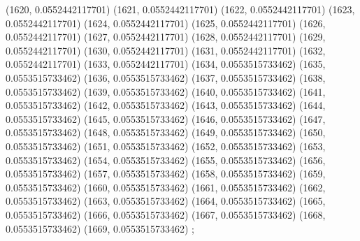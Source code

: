 {					(1620, 0.0552442117701)
					(1621, 0.0552442117701)
					(1622, 0.0552442117701)
					(1623, 0.0552442117701)
					(1624, 0.0552442117701)
					(1625, 0.0552442117701)
					(1626, 0.0552442117701)
					(1627, 0.0552442117701)
					(1628, 0.0552442117701)
					(1629, 0.0552442117701)
					(1630, 0.0552442117701)
					(1631, 0.0552442117701)
					(1632, 0.0552442117701)
					(1633, 0.0552442117701)
					(1634, 0.0553515733462)
					(1635, 0.0553515733462)
					(1636, 0.0553515733462)
					(1637, 0.0553515733462)
					(1638, 0.0553515733462)
					(1639, 0.0553515733462)
					(1640, 0.0553515733462)
					(1641, 0.0553515733462)
					(1642, 0.0553515733462)
					(1643, 0.0553515733462)
					(1644, 0.0553515733462)
					(1645, 0.0553515733462)
					(1646, 0.0553515733462)
					(1647, 0.0553515733462)
					(1648, 0.0553515733462)
					(1649, 0.0553515733462)
					(1650, 0.0553515733462)
					(1651, 0.0553515733462)
					(1652, 0.0553515733462)
					(1653, 0.0553515733462)
					(1654, 0.0553515733462)
					(1655, 0.0553515733462)
					(1656, 0.0553515733462)
					(1657, 0.0553515733462)
					(1658, 0.0553515733462)
					(1659, 0.0553515733462)
					(1660, 0.0553515733462)
					(1661, 0.0553515733462)
					(1662, 0.0553515733462)
					(1663, 0.0553515733462)
					(1664, 0.0553515733462)
					(1665, 0.0553515733462)
					(1666, 0.0553515733462)
					(1667, 0.0553515733462)
					(1668, 0.0553515733462)
					(1669, 0.0553515733462)
				};
